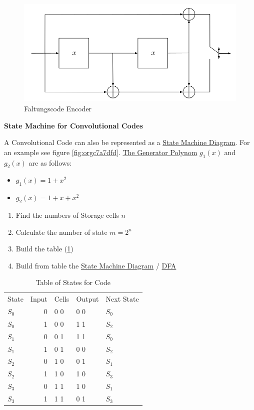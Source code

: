\documentclass[11pt,twoside,twocolumn,landscape]{article}
\begin{document}
\begin{figure}[htbp]
\centering
\includegraphics[width=.9\linewidth]{img/encoders_faltungscodes.png}
\caption{\label{fig:org95e6043}Faltungscode Encoder}
\end{figure}


\textbf{State Machine for Convolutional Codes}

A Convolutional Code can also be represented as a \href{../../../roam/20211108155646-state_machine_diagram.org}{State Machine Diagram}.
For an example see figure \ref{fig:orgc7a7dfd}.
\href{../../../roam/20211105145648-the_generator_polynom_for_hamming_codes.org}{The Generator Polynom} \(g_1(x)\) and \(g_2(x)\) are as follows:

\begin{itemize}
\item \(g_1(x) = 1 + x^2\)
\item \(g_2(x) = 1 + x + x^2\)
\end{itemize}


\begin{enumerate}
\item Find the numbers of Storage cells \(n\)
\item Calculate the number of state \(m = 2^n\)
\item Build the table (\ref{tab:org96b2831})
\item Build from table the \href{../../../roam/20211108155646-state_machine_diagram.org}{State Machine Diagram} / \href{../../../roam/20211109182310-deterministic_finite_automaton.org}{DFA}
\end{enumerate}


\begin{table}[htbp]
\caption{\label{tab:org96b2831}Table of States for Code}
\centering
\begin{tabular}{lrlll}
State & Input & Cells & Output & Next State\\
\(S_0\) & 0 & 0 0 & 0 0 & \(S_0\)\\
\(S_0\) & 1 & 0 0 & 1 1 & \(S_2\)\\
\(S_1\) & 0 & 0 1 & 1 1 & \(S_0\)\\
\(S_1\) & 1 & 0 1 & 0 0 & \(S_2\)\\
\(S_2\) & 0 & 1 0 & 0 1 & \(S_1\)\\
\(S_2\) & 1 & 1 0 & 1 0 & \(S_3\)\\
\(S_3\) & 0 & 1 1 & 1 0 & \(S_1\)\\
\(S_3\) & 1 & 1 1 & 0 1 & \(S_3\)\\
\end{tabular}
\end{table}
\end{document}
